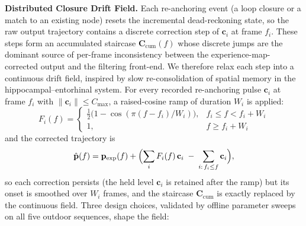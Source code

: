 \textbf{Distributed Closure Drift Field.} Each re-anchoring event (a loop closure or a match to an existing node) resets the incremental dead-reckoning state, so the raw output trajectory contains a discrete correction step of $\mathbf{c}_i$ at frame $f_i$. These steps form an accumulated staircase $\mathbf{C}_{\mathrm{cum}}(f)$ whose discrete jumps are the dominant source of per-frame inconsistency between the experience-map-corrected output and the filtering front-end. We therefore relax each step into a continuous drift field, inspired by slow re-consolidation of spatial memory in the hippocampal--entorhinal system. For every recorded re-anchoring pulse $\mathbf{c}_i$ at frame $f_i$ with $\lVert\mathbf{c}_i\rVert \le C_{\max}$, a raised-cosine ramp of duration $W_i$ is applied:
\begin{equation}
    F_i(f) =
    \begin{cases}
        \tfrac{1}{2}\bigl(1-\cos(\pi (f-f_i)/W_i)\bigr), & f_i \le f < f_i + W_i \\
        1, & f \ge f_i + W_i
    \end{cases}
\end{equation}
and the corrected trajectory is
\begin{equation}
    \hat{\mathbf{p}}(f) = \mathbf{p}_{\mathrm{exp}}(f) + \Bigl(\sum_i F_i(f)\,\mathbf{c}_i \;-\; \sum_{i:\,f_i \le f}\mathbf{c}_i\Bigr),
\end{equation}
so each correction persists (the held level $\mathbf{c}_i$ is retained after the ramp) but its onset is smoothed over $W_i$ frames, and the staircase $\mathbf{C}_{\mathrm{cum}}$ is exactly replaced by the continuous field. Three design choices, validated by offline parameter sweeps on all five outdoor sequences, shape the field:
